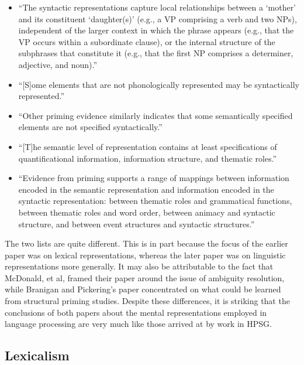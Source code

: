 \documentclass[a4paper]{article}
\begin{document}
\begin{itemize}
\item ``The syntactic representations capture local relationships
between a `mother' and its constituent `daughter(s)' (e.g.,
a VP comprising a verb and two NPs), independent of the
larger context in which the phrase appears (e.g., that the VP
occurs within a subordinate clause), or the internal structure
of the subphrases that constitute it (e.g., that the
first NP comprises a determiner, adjective, and noun).''
\item ``[S]ome elements that are not phonologically represented may
be syntactically represented.''
\item ``Other priming evidence similarly indicates that some
semantically specified elements are not specified syntactically.''
\item ``[T]he semantic level of representation
contains at least specifications of quantificational information,
information structure, and thematic roles.''
\item ``Evidence
from priming supports a range of mappings between information encoded in the semantic representation and information encoded in the syntactic representation: between
thematic roles and grammatical functions, between thematic roles and word order, between animacy and syntactic
structure, and between event structures and syntactic
structures.''
\end{itemize}
The two lists are quite different.  This is in part because the focus of the earlier paper was on lexical representations, whereas the later paper was on linguistic representations more generally.  It may also be attributable to the fact that McDonald, et al, framed their paper around the issue of ambiguity resolution, while Branigan and Pickering's paper concentrated on what could be learned from structural priming studies.  Despite these differences, it is striking that the conclusions of both papers about the mental representations employed in language processing are very much like those arrived at by work in HPSG.

\subsection{Lexicalism}
\end{document}
